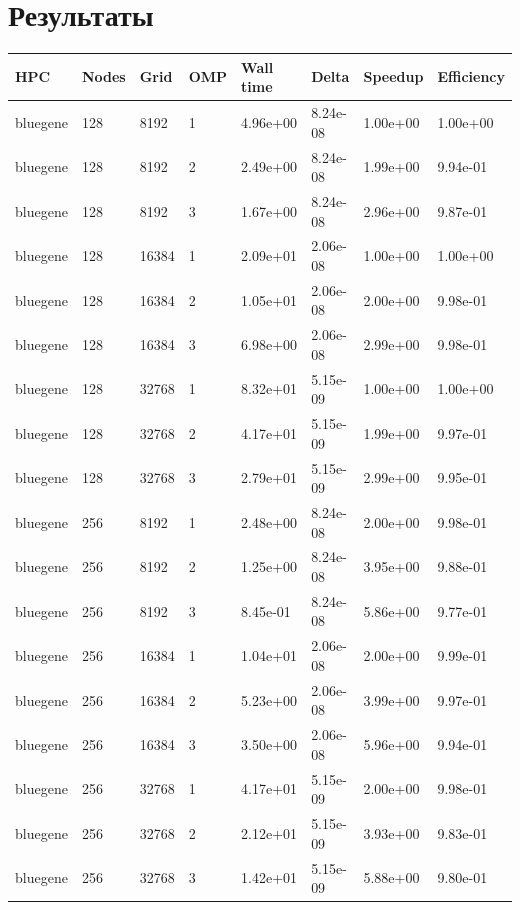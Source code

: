 \documentclass[12pt,a4paper]{scrartcl}
\begin{document}
\newpage

\section{Результаты}

\begin{center}
\begin{table}[h]
\begin{tabular}{l|lllllll}
\label{tabular:bluegene}
HPC & Nodes & Grid & OMP & Wall time & Delta & Speedup & Efficiency \\
\hline
bluegene & 128 & 8192 & 1 & 4.96e+00 & 8.24e-08 & 1.00e+00 & 1.00e+00 \\
bluegene & 128 & 8192 & 2 & 2.49e+00 & 8.24e-08 & 1.99e+00 & 9.94e-01 \\
bluegene & 128 & 8192 & 3 & 1.67e+00 & 8.24e-08 & 2.96e+00 & 9.87e-01 \\
bluegene & 128 & 16384 & 1 & 2.09e+01 & 2.06e-08 & 1.00e+00 & 1.00e+00 \\
bluegene & 128 & 16384 & 2 & 1.05e+01 & 2.06e-08 & 2.00e+00 & 9.98e-01 \\
bluegene & 128 & 16384 & 3 & 6.98e+00 & 2.06e-08 & 2.99e+00 & 9.98e-01 \\
bluegene & 128 & 32768 & 1 & 8.32e+01 & 5.15e-09 & 1.00e+00 & 1.00e+00 \\
bluegene & 128 & 32768 & 2 & 4.17e+01 & 5.15e-09 & 1.99e+00 & 9.97e-01 \\
bluegene & 128 & 32768 & 3 & 2.79e+01 & 5.15e-09 & 2.99e+00 & 9.95e-01 \\
bluegene & 256 & 8192 & 1 & 2.48e+00 & 8.24e-08 & 2.00e+00 & 9.98e-01 \\
bluegene & 256 & 8192 & 2 & 1.25e+00 & 8.24e-08 & 3.95e+00 & 9.88e-01 \\
bluegene & 256 & 8192 & 3 & 8.45e-01 & 8.24e-08 & 5.86e+00 & 9.77e-01 \\
bluegene & 256 & 16384 & 1 & 1.04e+01 & 2.06e-08 & 2.00e+00 & 9.99e-01 \\
bluegene & 256 & 16384 & 2 & 5.23e+00 & 2.06e-08 & 3.99e+00 & 9.97e-01 \\
bluegene & 256 & 16384 & 3 & 3.50e+00 & 2.06e-08 & 5.96e+00 & 9.94e-01 \\
bluegene & 256 & 32768 & 1 & 4.17e+01 & 5.15e-09 & 2.00e+00 & 9.98e-01 \\
bluegene & 256 & 32768 & 2 & 2.12e+01 & 5.15e-09 & 3.93e+00 & 9.83e-01 \\
bluegene & 256 & 32768 & 3 & 1.42e+01 & 5.15e-09 & 5.88e+00 & 9.80e-01 \\

\end{tabular}
\end{table}
\end{center}
\end{document}
